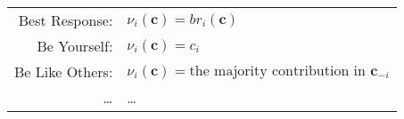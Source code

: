 \documentclass[preview, varwidth=14cm, border={0pt 1pt 1pt 1pt}]{standalone} %
\begin{document}








    










    \begin{tabular}{rl}
        Best Response: & \(\nu_i(\bm{c}) = \mathit{br}_i(\bm{c})\) \\[0.2cm]
            Be Yourself: & \(\nu_i(\bm{c}) = c_i\)  \\[0.2cm] 
        Be Like Others: & 
        \(\nu_i(\bm{c}) = \text{the majority contribution in } \bm{c}_{-i}\) \\ 
        \dots   & \dots
    \end{tabular}
\end{document}
